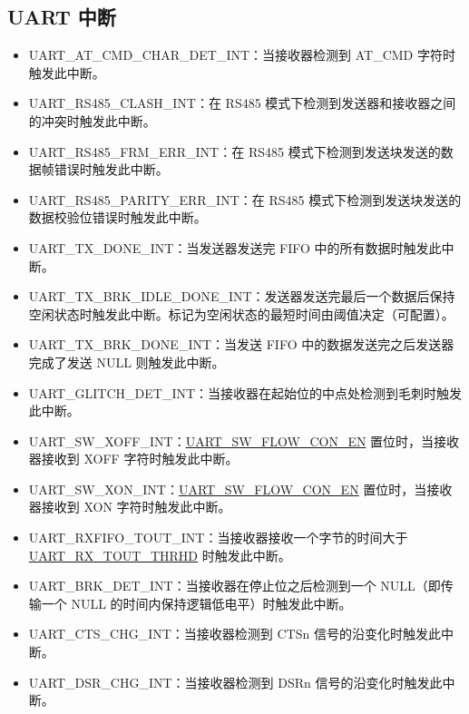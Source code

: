 \documentclass[main\_\_CN.tex]{subfiles}
\begin{document}
\subsection{UART 中断}
\begin{itemize}
\item \label{int:UARTATCMDCHARDETINT}UART\_AT\_CMD\_CHAR\_DET\_INT：当接收器检测到 AT\_CMD 字符时触发此中断。
\item \label{int:UARTRS485CLASHINT}UART\_RS485\_CLASH\_INT：在 RS485 模式下检测到发送器和接收器之间的冲突时触发此中断。
\item \label{int:UARTRS485FRMERRINT}UART\_RS485\_FRM\_ERR\_INT：在 RS485 模式下检测到发送块发送的数据帧错误时触发此中断。
\item \label{int:UARTRS485PARITYERRINT}UART\_RS485\_PARITY\_ERR\_INT：在 RS485 模式下检测到发送块发送的数据校验位错误时触发此中断。
\item \label{int:UARTTXDONEINT}UART\_TX\_DONE\_INT：当发送器发送完 FIFO 中的所有数据时触发此中断。
\item \label{int:UARTTXBRKIDLEDONEINT}UART\_TX\_BRK\_IDLE\_DONE\_INT：发送器发送完最后一个数据后保持空闲状态时触发此中断。标记为空闲状态的最短时间由阈值决定（可配置）。
\item \label{int:UARTTXBRKDONEINT}UART\_TX\_BRK\_DONE\_INT：当发送 FIFO 中的数据发送完之后发送器完成了发送 NULL 则触发此中断。
\item \label{int:UARTGLITCHDETINT}UART\_GLITCH\_DET\_INT：当接收器在起始位的中点处检测到毛刺时触发此中断。
\item \label{int:UARTSWXOFFINT}UART\_SW\_XOFF\_INT：\hyperref[fielddesc:UARTSWFLOWCONEN]{UART\_SW\_FLOW\_CON\_EN} 置位时，当接收器接收到 XOFF 字符时触发此中断。
\item \label{int:UARTSWXONINT}UART\_SW\_XON\_INT：\hyperref[fielddesc:UARTSWFLOWCONEN]{UART\_SW\_FLOW\_CON\_EN} 置位时，当接收器接收到 XON 字符时触发此中断。
\item \label{int:UARTRXFIFOTOUTINT}UART\_RXFIFO\_TOUT\_INT：当接收器接收一个字节的时间大于 \hyperref[fielddesc:UARTRXTOUTTHRHD]{UART\_RX\_TOUT\_THRHD} 时触发此中断。
\item \label{int:UARTBRKDETINT}UART\_BRK\_DET\_INT：当接收器在停止位之后检测到一个 NULL（即传输一个 NULL 的时间内保持逻辑低电平）时触发此中断。
\item \label{int:UARTCTSCHGINT}UART\_CTS\_CHG\_INT：当接收器检测到 CTSn 信号的沿变化时触发此中断。
\item \label{int:UARTDSRCHGINT}UART\_DSR\_CHG\_INT：当接收器检测到 DSRn 信号的沿变化时触发此中断。

\end{itemize}
\end{document}
